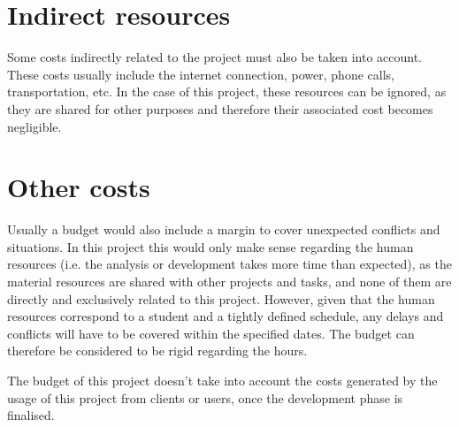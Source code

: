 \section{Indirect resources}
Some costs indirectly related to the project must also be taken into account. These costs usually include the internet connection, power, phone calls, transportation, etc. In the case of this project, these resources can be ignored, as they are shared for other purposes and therefore their associated cost becomes negligible.

\section{Other costs}
Usually a budget would also include a margin to cover unexpected conflicts and situations. In this project this would only make sense regarding the human resources (i.e. the analysis or development takes more time than expected), as the material resources are shared with other projects and tasks, and none of them are directly and exclusively related to this project. However, given that the human resources correspond to a student and a tightly defined schedule, any delays and conflicts will have to be covered within the specified dates. The budget can therefore be considered to be rigid regarding the hours.

The budget of this project doesn’t take into account the costs generated by the usage of this project from clients or users, once the development phase is finalised.